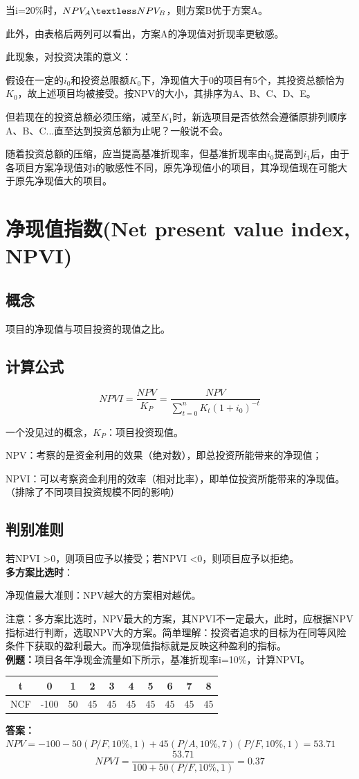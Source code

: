 当i=20\%时，$NPV_A \textless NPV_B$，则方案B优于方案A。

此外，由表格后两列可以看出，方案A的净现值对折现率更敏感。

此现象，对投资决策的意义：

假设在一定的$i_0$和投资总限额$K_0$下，净现值大于0的项目有5个，其投资总额恰为$K_0$，故上述项目均被接受。按NPV的大小，其排序为A、B、C、D、E。

但若现在的投资总额必须压缩，减至$K_1$时，新选项目是否依然会遵循原排列顺序A、B、C...直至达到投资总额为止呢？一般说不会。

随着投资总额的压缩，应当提高基准折现率，但基准折现率由$i_0$提高到$i_1$后，由于各项目方案净现值对i的敏感性不同，原先净现值小的项目，其净现值现在可能大于原先净现值大的项目。

\section{净现值指数(Net present value index, NPVI)}
\subsection{概念}
项目的净现值与项目投资的现值之比。
\subsection{计算公式}
$$NPVI=\frac{NPV}{K_P}=\frac{NPV}{\sum_{t=0}^{n}K_t(1+i_0)^{-t}}$$

一个没见过的概念，$K_P$：项目投资现值。

NPV：考察的是资金利用的效果（绝对数），即总投资所能带来的净现值；

NPVI：可以考察资金利用的效率（相对比率），即单位投资所能带来的净现值。（排除了不同项目投资规模不同的影响）

\subsection{判别准则}

若NPVI \textgreater 0，则项目应予以接受；若NPVI \textless 0，则项目应予以拒绝。\\
\textbf{多方案比选时}：

净现值最大准则：NPV越大的方案相对越优。

注意：多方案比选时，NPV最大的方案，其NPVI不一定最大，此时，应根据NPV指标进行判断，选取NPV大的方案。简单理解：投资者追求的目标为在同等风险条件下获取的盈利最大。而净现值指标就是反映这种盈利的指标。\\
\textbf{例题：}项目各年净现金流量如下所示，基准折现率i=10\%，计算NPVI。
\begin{table}[H]
\centering
\begin{tabular}{|c|c|c|c|c|c|c|c|c|c|}
\hline
t   & 0 & 1 & 2 & 3 & 4  & 5  & 6  & 7   & 8      \\ \hline
NCF   & -100 & 50  & 45  & 45  & 45  & 45  & 45  & 45  & 45     \\ \hline
\end{tabular}
\end{table}
\textbf{答案：}$NPV =-100-50(P/F,10\%,1)+45(P/A,10\%,7)(P/F,10\%,1)=53.71$
$$NPVI=\frac{53.71}{100+50(P/F,10\%,1)}=0.37$$

